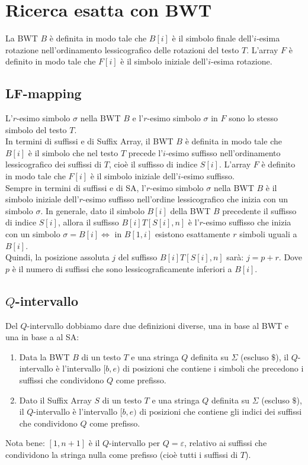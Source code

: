 \section{Ricerca esatta con BWT}
La BWT $B$ è definita in modo tale che $B[i]$ è il simbolo finale dell’$i$-esima rotazione nell’ordinamento lessicografico delle rotazioni del testo $T$. L’array $F$ è definito in modo tale che $F[i]$ è il simbolo iniziale dell’$i$-esima rotazione.

\subsection{LF-mapping}
L’$r$-esimo simbolo $\sigma$ nella BWT $B$ e l’$r$-esimo simbolo $\sigma$ in $F$ sono lo stesso simbolo del testo $T$.\\

In termini di suffissi e di Suffix Array, il BWT $B$ è definita in modo tale che $B[i]$ è il simbolo che nel testo $T$ precede l’$i$-esimo suffisso nell’ordinamento lessicografico dei suffissi di $T$, cioè il suffisso di indice $S[i]$. L’array $F$ è definito in modo tale che $F[i]$ è il simbolo iniziale dell’$i$-esimo suffisso.\\
Sempre in termini di suffissi e di SA, l’$r$-esimo simbolo $\sigma$ nella BWT $B$ è il simbolo iniziale dell’$r$-esimo suffisso nell’ordine lessicografico che inizia con un simbolo $\sigma$. In generale, dato il simbolo $B[i]$ della BWT $B$ precedente il suffisso di indice $S[i]$, allora il suffisso $B[i]T[S[i],n]$ è l’$r$-esimo suffisso che inizia con un simbolo $\sigma=B[i] \iff$ in $B[1,i]$ esistono esattamente $r$ simboli uguali a $B[i]$.\\

Quindi, la posizione assoluta $j$ del suffisso $B[i]T[S[i],n]$ sarà: $j = p + r$. Dove $p$ è il numero di suffissi che sono lessicograficamente inferiori a $B[i]$.
\subsection{\texorpdfstring{$Q$}{}-intervallo}
Del $Q$-intervallo dobbiamo dare due definizioni diverse, una in base al BWT e una in base a al SA:
\begin{enumerate}
    \item Data la BWT $B$ di un testo $T$ e una stringa $Q$ definita su $\Sigma$ (escluso $\$$), il $Q$-intervallo è l’intervallo $[b,e)$ di posizioni che contiene i simboli che precedono i suffissi che condividono $Q$ come prefisso.
    \item Dato il Suffix Array $S$ di un testo $T$ e una stringa $Q$ definita su $\Sigma$ (escluso $\$$), il $Q$-intervallo è l’intervallo $[b,e)$ di posizioni che contiene gli indici dei suffissi che condividono $Q$ come prefisso.
\end{enumerate}
Nota bene: $[1, n+1]$ è il $Q$-intervallo per $Q=\varepsilon$, relativo ai suffissi che condividono la stringa nulla come prefisso (cioè tutti i suffissi di $T$).\\

